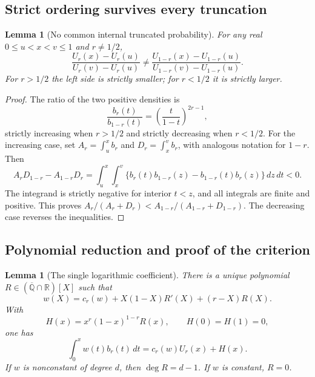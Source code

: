 \documentclass[11pt,a4paper]{article}
\newtheorem{lemma}[theorem]{Lemma}
\theoremstyle{definition}
\theoremstyle{remark}
\numberwithin{equation}{section}
\begin{document}
\subsection{Strict ordering survives every truncation}

\begin{lemma}[No common internal truncated probability]
\label{p7:cb:ordering}
For any real $0\le u<x<v\le1$ and $r\ne1/2$,
\begin{equation}\label{p7:cb:strict-cdf}
 \frac{U_r(x)-U_r(u)}{U_r(v)-U_r(u)}
 \ne
 \frac{U_{1-r}(x)-U_{1-r}(u)}
      {U_{1-r}(v)-U_{1-r}(u)}.
\end{equation}
For $r>1/2$ the left side is strictly smaller; for $r<1/2$
it is strictly larger.
\end{lemma}

\begin{proof}
The ratio of the two positive densities is
\[
 \frac{b_r(t)}{b_{1-r}(t)}
   =\left(\frac{t}{1-t}\right)^{2r-1},
\]
strictly increasing when $r>1/2$ and strictly decreasing
when $r<1/2$. For the increasing case, set
$A_r=\int_u^x b_r$ and $D_r=\int_x^v b_r$, with analogous
notation for $1-r$. Then
\[
 A_rD_{1-r}-A_{1-r}D_r
 =\int_u^x\int_x^v
    \{b_r(t)b_{1-r}(z)-b_{1-r}(t)b_r(z)\}\,dz\,dt<0.
\]
The integrand is strictly negative for interior $t<z$,
and all integrals are finite and positive. This proves
$A_r/(A_r+D_r)<A_{1-r}/(A_{1-r}+D_{1-r})$.
The decreasing case reverses the inequalities.
\end{proof}

\subsection{Polynomial reduction and proof of the criterion}

\begin{lemma}[The single logarithmic coefficient]\label{p7:cb:reduction}
There is a unique polynomial $R\in(\overline{\mathbb Q}\cap\mathbb R)[X]$
such that
\begin{equation}\label{p7:cb:operator}
 w(X)=c_r(w)+X(1-X)R'(X)+(r-X)R(X).
\end{equation}
With
\begin{equation}\label{p7:cb:H}
 H(x)=x^r(1-x)^{1-r}R(x),\qquad H(0)=H(1)=0,
\end{equation}
one has
\begin{equation}\label{p7:cb:primitive}
 \int_0^xw(t)b_r(t)\,dt=c_r(w)U_r(x)+H(x).
\end{equation}
If $w$ is nonconstant of degree $d$, then $\deg R=d-1$.
If $w$ is constant, $R=0$.
\end{lemma}
\end{document}
